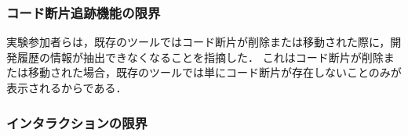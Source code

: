 \subsubsection*{コード断片追跡機能の限界}







実験参加者らは，既存のツールではコード断片が削除または移動された際に，開発履歴の情報が抽出できなくなることを指摘した．
これはコード断片が削除または移動された場合，既存のツールでは単にコード断片が存在しないことのみが表示されるからである．



\subsubsection*{インタラクションの限界}

